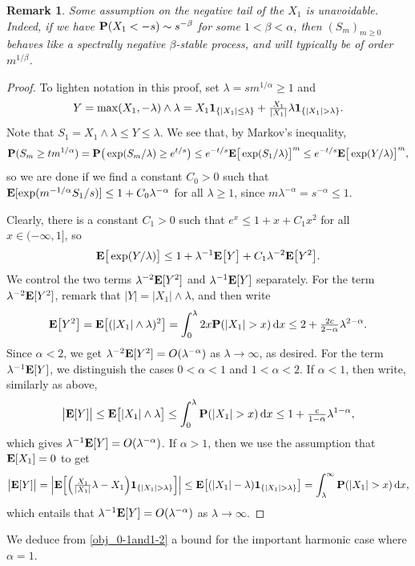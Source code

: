\documentclass[11pt,reqno]{amsart}
\newtheorem*{rmk}{Remark}
\begin{document}
\begin{rmk} Some assumption on the negative tail of the $X_1$ is unavoidable. Indeed, if we have $\P(X_1<-s) \sim s^{-\beta}$ for some $1<\beta<\alpha$, then $(S_m)_{m \geq 0}$ behaves like a spectrally negative $\beta$-stable process, and will typically be of order $m^{1/\beta}$.
\end{rmk}

\begin{proof}
To lighten notation in this proof, set $\lambda= sm^{1/\alpha}\geq 1$ and
\[Y=\max(X_1,-\lambda)\wedge \lambda=X_1\I{|X_1|\leq \lambda}+\tfrac{X_1}{|X_1|}\lambda\I{|X_1|>\lambda}.\]
Note that $S_1=X_1\wedge \lambda \leq Y\leq\lambda$. We see that, by Markov's inequality,
\[\P(S_m\ge tm^{1/\alpha}) = \P\big(\exp(S_m/\lambda)\ge e^{t/s}\big) \le e^{-t/s} \E\big[\exp(S_1/\lambda) \big]^m \le e^{-t/s} \E\big[\exp(Y/\lambda) \big]^m,\]
so we are done if we find a constant $C_0>0$ such that $\E[\exp(m^{-1/\alpha}S_1/s) ]\leq 1+ C_0 \lambda^{-\alpha}$ for all $\lambda\geq 1$, since $m\lambda^{-\alpha}=s^{-\alpha}\leq 1$.

Clearly, there is a constant $C_1>0$ such that $e^x\leq 1+x+C_1 x^2$ for all $x\in (-\infty,1]$, so
\[\E\big[\exp(Y/\lambda) \big]\leq 1 + \lambda^{-1}\E\big[Y\big]+ C_1\lambda^{-2}\E\big[Y^2\big].\]
We control the two terms $\lambda^{-2}\E[Y^2]$ and $\lambda^{-1}\E[Y]$ separately. For the term $\lambda^{-2}\E[Y^2]$, remark that $|Y|=|X_1|\wedge\lambda$, and then write
\[\E\big[Y^2\big]=\E\big[(|X_1|\wedge\lambda)^2\big]=\int_0^{\lambda}2x\P(|X_1|>x)\, \dd x\leq 2 +\tfrac{2c}{2-\alpha}\lambda^{2-\alpha}.\]
Since $\alpha<2$, we get $\lambda^{-2}\E[Y^2]=O(\lambda^{-\alpha})$ as $\lambda\to\infty$, as desired. For the term $\lambda^{-1}\E[Y]$, we distinguish the cases $0<\alpha<1$ and $1<\alpha<2$. If $\alpha<1$, then write, similarly as above, 
\[\big|\E[Y]\big|\leq \E\big[|X_1|\wedge\lambda\big]\leq \int_0^\lambda \P(|X_1|>x)\, \dd x\leq 1 +\tfrac{c}{1-\alpha}\lambda^{1-\alpha},\] which gives $\lambda^{-1}\E[Y]=O(\lambda^{-\alpha})$. If $\alpha>1$, then we use the assumption that $\E[X_1]=0$ to get
\[\big|\E[Y]\big|=\Big|\E\Big[\Big(\tfrac{X_1}{|X_1|}\lambda-X_1\Big)\I{|X_1|>\lambda}\Big]\Big| \leq \E\big[(|X_1|-\lambda)\I{|X_1|> \lambda}\big]=\int_\lambda^\infty \P(|X_1|>x) \,\dd x,\]
which entails that $\lambda^{-1}\E[Y]=O(\lambda^{-\alpha})$ as $\lambda\to\infty$.
\end{proof}

We deduce from \cref{obj_0-1and1-2} a bound for the important harmonic case where $\alpha=1$.
\end{document}
